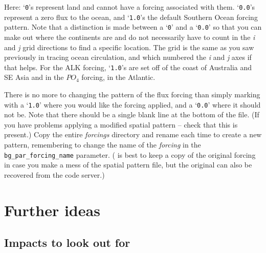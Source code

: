 \documentclass[11pt,fleqn]{book} %
\begin{document}
Here: ‘\texttt{0}’s represent land and cannot have a forcing associated with them. ‘\texttt{0.0}’s represent a zero flux to the ocean, and ‘\texttt{1.0}’s the default Southern Ocean forcing pattern. Note that a distinction is made between a ‘\texttt{0}’ and a ‘\texttt{0.0}’ so that you can make out where the continents are and do not necessarily have to count in the \textit{i} and \textit{j} grid directions to find a specific location. The grid is the same as you saw previously in tracing ocean circulation, and which numbered the \textit{i} and \textit{j} axes if that helps. For the ALK forcing, ‘\texttt{1.0}’s are set off of the coast of Australia and SE Asia and in the \(PO_{4}\) forcing, in the Atlantic.

There is no more to changing the pattern of the flux forcing than simply marking with a ‘\texttt{1.0}’ where you would like the forcing applied, and a ‘\texttt{0.0}’ where it should not be. Note that there should be a single blank line at the bottom of the file. (If you have problems applying a modified spatial pattern – check that this is present.) Copy the entire \textit{forcings} directory and rename each time to create a new pattern, remembering to change the name of the \textit{forcing} in the \texttt{bg\_par\_forcing\_name} parameter. ( is best to keep a copy of the original forcing in case you make a mess of the spatial pattern file, but the original can also be recovered from the code server.)


\newpage


\section{Further ideas}


\subsection{Impacts to look out for}
\end{document}
